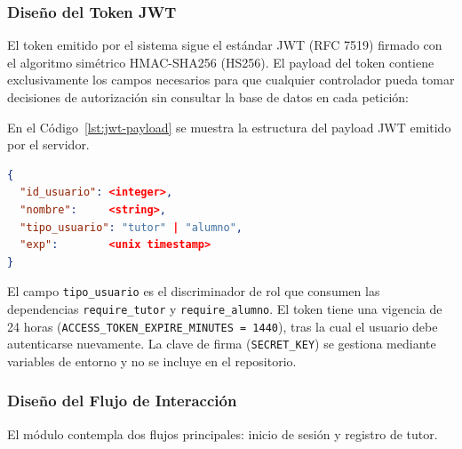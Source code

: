 \subsubsection{Diseño del Token JWT}
 
El token emitido por el sistema sigue el estándar JWT (RFC 7519) firmado
con el algoritmo simétrico HMAC-SHA256 (HS256). El payload del token
contiene exclusivamente los campos necesarios para que cualquier
controlador pueda tomar decisiones de autorización sin consultar la base
de datos en cada petición:
 
En el Código~\ref{lst:jwt-payload} se muestra la estructura del payload JWT emitido por el servidor.

\begin{lstlisting}[language=json, caption={Estructura del payload JWT emitido por el Back-End}, label={lst:jwt-payload}]
{
  "id_usuario": <integer>,
  "nombre":     <string>,
  "tipo_usuario": "tutor" | "alumno",
  "exp":        <unix timestamp>
}
\end{lstlisting}
 
El campo \texttt{tipo\_usuario} es el discriminador de rol que consumen
las dependencias \texttt{require\_tutor} y \texttt{require\_alumno}.
El token tiene una vigencia de 24 horas (\texttt{ACCESS\_TOKEN\_EXPIRE\_MINUTES = 1440}),
tras la cual el usuario debe autenticarse nuevamente. La clave de firma
(\texttt{SECRET\_KEY}) se gestiona mediante variables de entorno y no se
incluye en el repositorio.
 
\subsubsection{Diseño del Flujo de Interacción}
 
El módulo contempla dos flujos principales: inicio de sesión y registro
de tutor.
 
